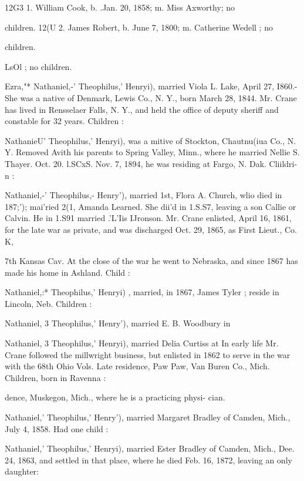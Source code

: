 \documentclass[oneside]{book}
\begin{document}
12G3  1. William Cook, b. .Jan. 20, 1858; m. Miss Axworthy; no 

children. 
12(U 2. James Robert, b. June 7, 1800; m. Catherine Wedell ; no 

children. 

LsOl ; no children. 

Ezra,"* Nathaniel,-' Theophilus,' Henryi), married Viola L. Lake, 
April 27, I860.- She was a native of Denmark, Lewis Co., N. 
Y., born March 28, 1844. Mr. Crane has lived in Rensselaer 
Falls, N. Y., and held the office of deputy sheriff and constable 
for 32 years. Children : 


NathanieU' Theophilus,' Henryi), was a mitive of Stockton, 
Chautnu(iua Co., N. Y. Removed Avith his parents to Spring 
Valley, Minn., where he married Nellie S. Thayer. Oct. 20. l.SCxS. 
Nov. 7, 1894, he was residing at Fargo, N. Dak. Cliildri-n : 



Nathaniel,-' Theophilus,- Henry'), married 1st, Flora A. Church, 
wlio died in 187;'); mai'ried 2(1, Amanda Learned. She dii'd in 
1.S.S7, leaving a son Callie or Calvin. He in 1.S91 married .'L'Iis 
IJronson. Mr. Crane enlisted, April 16, 1861, for the late war as 
private, and was discharged Oct. 29, 1865, as First Lieut., Co. K, 




7th Kansas Cav. At the close of the war he went to Nebraska, 
and since 1867 has made his home in Ashland. Child : 

Nathaniel,:* Theophilus,' Henryi) , married, in 1867, James Tyler ; 
reside in Lincoln, Neb. Children : 





Nathaniel, 3 Theophilus,' Henry'), married E. B. Woodbury in 



Nathaniel, 3 Theophilus,' Henryi), married Delia Curtiss at 
In early life Mr. Crane followed the millwright business, but 
enlisted in 1862 to serve in the war with the 68th Ohio Vols. 
Late residence, Paw Paw, Van Buren Co., Mich. Children, born 
in Ravenna : 

dence, Muskegon, Mich., where he is a practicing physi- 
cian. 


Nathaniel,' Theophilus,' Henry'), married Margaret Bradley of 
Camden, Mich., July 4, 1858. Had one child : 


Nathaniel,' Theophilus,' Henryi), married Ester Bradley of 
Camden, Mich., Dee. 24, 1863, and settled in that place, where 
he died Feb. 16, 1872, leaving an only daughter: 
\end{document}
